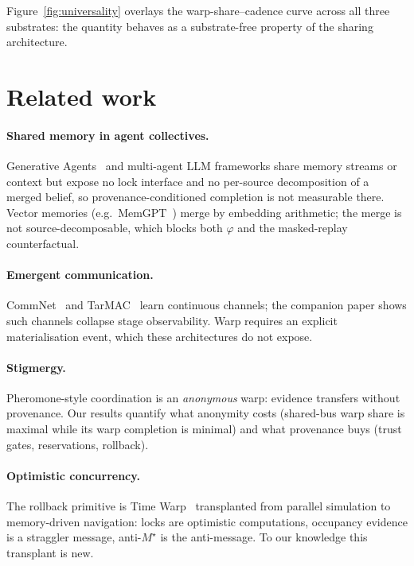 \documentclass{article}
\newcommand{\mstar}{M^{\star}}
\begin{document}
Figure~\ref{fig:universality} overlays the warp-share--cadence curve
across all three substrates: the quantity behaves as a substrate-free
property of the sharing architecture.

\section{Related work}
\label{sec:related}

\paragraph{Shared memory in agent collectives.} Generative
Agents~\cite{park2023generative} and multi-agent LLM frameworks share
memory streams or context but expose no lock interface and no
per-source decomposition of a merged belief, so provenance-conditioned
completion is not measurable there. Vector memories (e.g.\
MemGPT~\cite{packer2023memgpt}) merge by embedding arithmetic;
the merge is not source-decomposable, which blocks both $\varphi$ and
the masked-replay counterfactual.
\paragraph{Emergent communication.} CommNet~\cite{sukhbaatar2016commnet}
and TarMAC~\cite{das2019tarmac} learn continuous channels; the
companion paper shows such channels collapse stage observability. Warp
requires an explicit materialisation event, which these architectures
do not expose.
\paragraph{Stigmergy.} Pheromone-style coordination is an
\emph{anonymous} warp: evidence transfers without provenance. Our
results quantify what anonymity costs (shared-bus warp share is
maximal while its warp completion is minimal) and what
provenance buys (trust gates, reservations, rollback).
\paragraph{Optimistic concurrency.} The rollback primitive is Time
Warp~\cite{jefferson1985} transplanted from parallel simulation to
memory-driven navigation: locks are optimistic computations,
occupancy evidence is a straggler message, anti-$\mstar$ is the
anti-message. To our knowledge this transplant is new.
\end{document}
